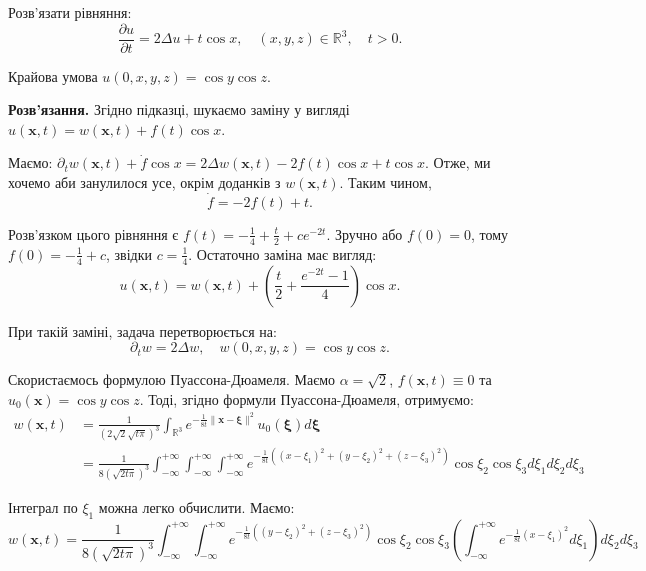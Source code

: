 \documentclass{hw_template}
\begin{document}
\begin{problem}
    Розв'язати рівняння:
    \begin{equation*}
        \frac{\partial u}{\partial t} = 2\Delta u + t \cos x, \quad (x,y,z) \in \mathbb{R}^3, \quad t > 0.
    \end{equation*}

    Крайова умова $u(0,x,y,z)=\cos y \cos z$.
\end{problem}

\textbf{Розв'язання.} Згідно підказці, шукаємо заміну у вигляді
$u(\mathbf{x},t) = w(\mathbf{x},t) + f(t)\cos x$.

Маємо: $\partial_t w(\mathbf{x},t) + \dot{f}\cos x = 2\Delta w(\mathbf{x},t) - 2f(t)\cos x + t
\cos x$. Отже, ми хочемо аби занулилося усе, окрім доданків з $w(\mathbf{x},t)$. Таким чином,
\begin{equation*}
    \dot{f} = -2f(t) + t.
\end{equation*}

Розв'язком цього рівняння є $f(t) = -\frac{1}{4}+\frac{t}{2} + ce^{-2t}$. Зручно 
або $f(0)=0$, тому $f(0) = -\frac{1}{4}+c$, звідки $c=\frac{1}{4}$. Остаточно заміна 
має вигляд:
\begin{equation*}
    u(\mathbf{x},t) = w(\mathbf{x},t) + \left(\frac{t}{2}+\frac{e^{-2t}-1}{4}\right)\cos x.
\end{equation*}

При такій заміні, задача перетворюється на:
\begin{equation*}
    \partial_t w = 2\Delta w, \quad w(0,x,y,z) = \cos y \cos z.
\end{equation*}

Скористаємось формулою Пуассона-Дюамеля. Маємо $\alpha=\sqrt{2}$, 
$f(\mathbf{x},t) \equiv 0$ та $u_0(\mathbf{x})=\cos y \cos z$. Тоді, згідно формули Пуассона-Дюамеля,
отримуємо:
\begin{align*}
    w(\mathbf{x},t) &= \frac{1}{(2\sqrt{2}\sqrt{t\pi})^3}\int_{\mathbb{R}^3}e^{-\frac{1}{8t}\|\mathbf{x}-\boldsymbol{\xi}\|^2}u_0(\boldsymbol{\xi})d\boldsymbol{\xi} \\
    &= \frac{1}{8(\sqrt{2t\pi})^3}\int_{-\infty}^{+\infty}\int_{-\infty}^{+\infty}\int_{-\infty}^{+\infty}e^{-\frac{1}{8t}\left((x-\xi_1)^2+(y-\xi_2)^2+(z-\xi_3)^2\right)}\cos\xi_2 \cos\xi_3 d\xi_1 d\xi_2 d\xi_3
\end{align*}

Інтеграл по $\xi_1$ можна легко обчислити. Маємо:
\begin{equation*}
    w(\mathbf{x},t) = \frac{1}{8(\sqrt{2t\pi})^3}\int_{-\infty}^{+\infty}\int_{-\infty}^{+\infty}e^{-\frac{1}{8t}\left((y-\xi_2)^2+(z-\xi_3)^2\right)}\cos\xi_2 \cos\xi_3\left(\int_{-\infty}^{+\infty}e^{-\frac{1}{8t}(x-\xi_1)^2}d\xi_1\right) d\xi_2 d\xi_3
\end{equation*}
\end{document}
